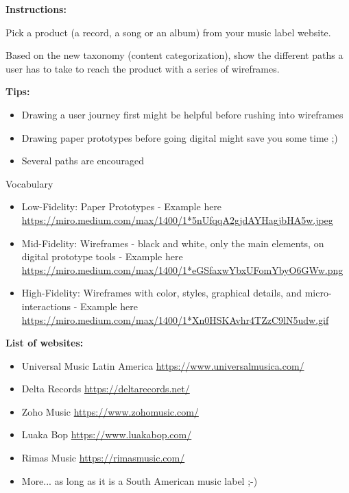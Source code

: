 \makeheaderfiles

\textbf{Instructions:}

Pick a product (a record, a song or an album) from your music label website.

Based on the new taxonomy (content categorization), show the different paths a user has to take to reach the product with a series of wireframes.

\textbf{Tips:}

\begin{itemize}
\item Drawing a user journey first might be helpful before rushing into wireframes
\item Drawing paper prototypes before going digital might save you some time ;)
\item Several paths are encouraged
\end{itemize}

Vocabulary

\begin{itemize}
\item Low-Fidelity: Paper Prototypes - Example here \url{https://miro.medium.com/max/1400/1*5nUfqqA2gjdAYHagjbHA5w.jpeg}
\item Mid-Fidelity: Wireframes - black and white, only the main elements, on digital prototype tools - Example here \url{https://miro.medium.com/max/1400/1*eGSfaxwYbxUFomYbyO6GWw.png}
\item High-Fidelity: Wireframes with color, styles, graphical details, and micro-interactions - Example here \url{https://miro.medium.com/max/1400/1*Xn0HSKAvhr4TZzC9lN5udw.gif}
\end{itemize}

\textbf{List of websites:}

\begin{itemize}
\item Universal Music Latin America \url{https://www.universalmusica.com/}
\item Delta Records \url{https://deltarecords.net/}
\item Zoho Music \url{https://www.zohomusic.com/}
\item Luaka Bop \url{https://www.luakabop.com/}
\item Rimas Music \url{https://rimasmusic.com/}
\item More... as long as it is a South American music label ;-)
\end{itemize}


